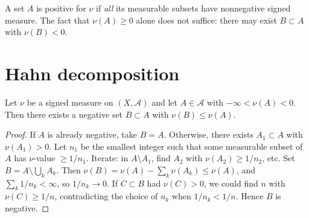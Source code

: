 \begin{attention}[title=\textbf{Positive for $\nu$ $\neq$ $\nu(A) \geq 0$}]
A set $A$ is positive for $\nu$ if \emph{all} its measurable subsets have nonnegative
signed measure. The fact that $\nu(A) \geq 0$ alone does not suffice: there may exist
$B \subset A$ with $\nu(B) < 0$.
\end{attention}

\section{Hahn decomposition}

\begin{lemma}
\label{lem:hahn_negative}
Let $\nu$ be a signed measure on $(X, \mathcal{A})$ and let $A \in \mathcal{A}$ with
$-\infty < \nu(A) < 0$. Then there exists a negative set $B \subset A$ with
$\nu(B) \leq \nu(A)$.
\end{lemma}

\begin{proof}
If $A$ is already negative, take $B = A$. Otherwise, there exists $A_1 \subset A$ with
$\nu(A_1) > 0$. Let $n_1$ be the smallest integer such that some measurable subset of
$A$ has $\nu$-value $\geq 1/n_1$. Iterate: in $A \setminus A_1$, find $A_2$ with
$\nu(A_2) \geq 1/n_2$, etc. Set $B = A \setminus \bigcup_k A_k$. Then
$\nu(B) = \nu(A) - \sum_k \nu(A_k) \leq \nu(A)$, and
$\sum_k 1/n_k < \infty$, so $1/n_k \to 0$. If $C \subset B$ had $\nu(C) > 0$,
we could find $n$ with $\nu(C) \geq 1/n$, contradicting the choice of $n_k$
when $1/n_k < 1/n$. Hence $B$ is negative.
\end{proof}

\begin{center}
\end{center}

